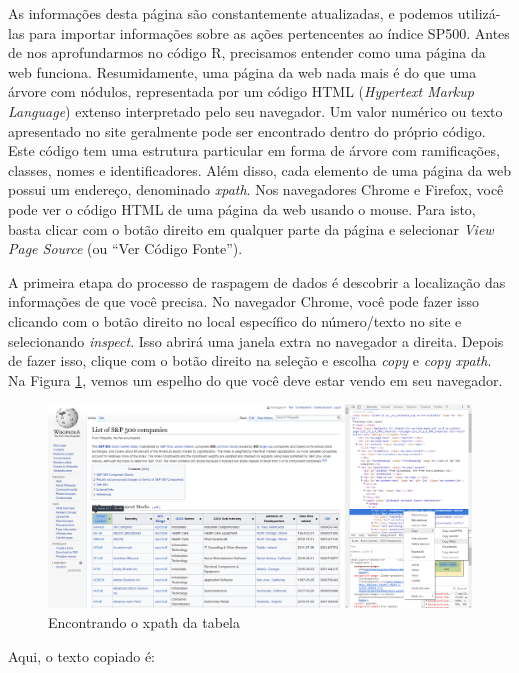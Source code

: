 \documentclass[
  11pt,
]{book}
\begin{document}
As informações desta página são constantemente atualizadas, e podemos utilizá-las para importar informações sobre as ações pertencentes ao índice SP500. Antes de nos aprofundarmos no código R, precisamos entender como uma página da web funciona. Resumidamente, uma página da web nada mais é do que uma árvore com nódulos, representada por um código HTML (\emph{Hypertext Markup Language}) extenso interpretado pelo seu navegador. Um valor numérico ou texto apresentado no site geralmente pode ser encontrado dentro do próprio código. Este código tem uma estrutura particular em forma de árvore com ramificações, classes, nomes e identificadores. Além disso, cada elemento de uma página da web possui um endereço, denominado \emph{xpath}. Nos navegadores Chrome e Firefox, você pode ver o código HTML de uma página da web usando o mouse. Para isto, basta clicar com o botão direito em qualquer parte da página e selecionar \emph{View Page Source} (ou ``Ver Código Fonte'').

A primeira etapa do processo de raspagem de dados é descobrir a localização das informações de que você precisa. No navegador Chrome, você pode fazer isso clicando com o botão direito no local específico do número/texto no site e selecionando \emph{inspect}. Isso abrirá uma janela extra no navegador a direita. Depois de fazer isso, clique com o botão direito na seleção e escolha \emph{copy} e \emph{copy xpath}. Na Figura \ref{fig:SP500-Wikipedia-webscraping}, vemos um espelho do que você deve estar vendo em seu navegador.

\begin{figure}[!htbp]

{\centering \includegraphics[width=0.75\linewidth]{00-text-resources/figs/SP500-Wikipedia_webscraping} 

}

\caption{Encontrando o xpath da tabela}\label{fig:SP500-Wikipedia-webscraping}
\end{figure}

Aqui, o texto copiado é:
\end{document}
